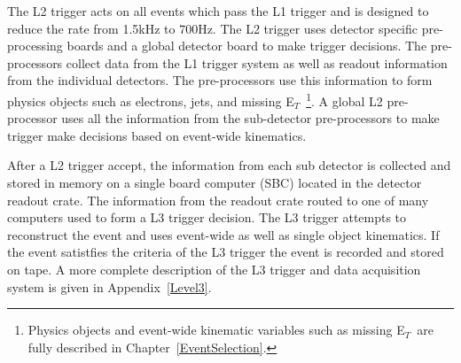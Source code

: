 The L2 trigger acts on all events which pass the L1 trigger and is designed to reduce the rate from 1.5kHz to $700$Hz. The L2 trigger uses detector specific pre-processing boards and a global detector board to make trigger decisions. The pre-processors collect data from the L1 trigger system as well as readout information from the individual detectors. The pre-processors use this information to form physics objects such as electrons, jets, and missing E$_{T}$~\footnote{Physics objects and event-wide kinematic variables such as missing E$_{T}$~are fully described in Chapter~\ref{EventSelection}.}. A global L2 pre-processor uses all the information from the sub-detector pre-processors to make trigger make decisions based on event-wide kinematics.

After a L2 trigger accept, the information from each sub detector is collected and stored in memory on a single board computer (SBC) located in the detector readout crate. The information from the readout crate routed to one of many computers used to form a L3 trigger decision. The L3 trigger attempts to reconstruct the event and uses event-wide as well as single object kinematics. If the event satistfies the criteria of the L3 trigger the event is recorded and stored on tape. A more complete description of the L3 trigger and data acquisition system is given in Appendix~\ref{Level3}.
